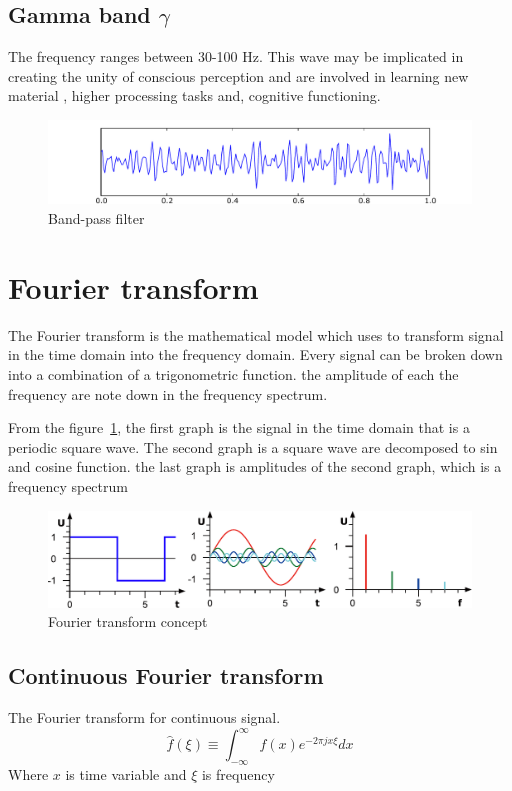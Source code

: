 \subsection{Gamma band $\gamma$} 
\hspace{1.5cm} The frequency ranges between 30-100 Hz. This wave may be implicated in creating the unity of conscious perception and are involved in learning new material , higher processing tasks and, cognitive functioning. 
\begin{figure}[ht]
	\centering
	\includegraphics[scale = 0.5]{chapter3/Eeg_gamma.pdf}
	\caption{Band-pass filter}
\end{figure}

\section{Fourier transform}
\hspace{1.5cm} The Fourier transform is the mathematical model which uses to transform signal in the time domain into the frequency domain. Every signal can be broken down into a combination of a trigonometric function.  the amplitude of each the frequency are note down in the frequency spectrum.\par
From the figure~\ref{fig:fourier}, the first graph is the signal in the time domain that is a periodic square wave. The second graph is a square wave are decomposed to sin and cosine function. the last graph is amplitudes of the second graph, which is a frequency spectrum \\
\begin{figure}[ht]
	\centering
	\includegraphics[width=0.9\linewidth]{chapter3/ft.pdf}
	\caption{Fourier transform concept\cite{ft}}
	\label{fig:fourier}
\end{figure}
\subsection{Continuous Fourier transform}
The Fourier transform for continuous signal. 
\begin{equation}\label{eq:ft}
\hat{f}(\xi)\equiv\int_{-\infty}^{\infty} f(x)e^{-2\pi jx\xi}dx
\end{equation}
Where $x$ is time variable and $\xi$ is frequency

